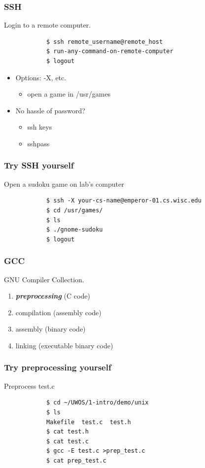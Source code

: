 \documentclass{beamer}
\begin{document}
	\begin{frame}[fragile]
		\frametitle{SSH}
		Login to a remote computer.
		\begin{center}
		\begin{verbatim}
			$ ssh remote_username@remote_host
			$ run-any-command-on-remote-computer
			$ logout
    \end{verbatim}
		\end{center}
		\begin{itemize}
      \item Options: -X, etc.
			\begin{itemize}
        \item open a game in /usr/games
      \end{itemize}
			\item No hassle of password? \\
			\begin{itemize}
				\item ssh keys
				\item sshpass
			\end{itemize}	
		\end{itemize}
	\end{frame}

	\begin{frame}[fragile]
		\frametitle{Try SSH yourself}
		Open a sudoku game on lab's computer
		\begin{center}
		\begin{verbatim}
			$ ssh -X your-cs-name@emperor-01.cs.wisc.edu
			$ cd /usr/games/
			$ ls
			$ ./gnome-sudoku
			$ logout
		\end{verbatim}
		\end{center}
	\end{frame}

  \begin{frame}
    \frametitle{GCC}
    GNU Compiler Collection.

		\begin{enumerate}
      \item \textbf{\textit{preprocessing}} (C code) 
      \item compilation (assembly code)
			\item assembly (binary code)
			\item linking (executable binary code)
    \end{enumerate}
	\end{frame}

	\begin{frame}[fragile]
		\frametitle{Try preprocessing yourself}
		Preprocess test.c
		\begin{center}
		\begin{verbatim}
			$ cd ~/UWOS/1-intro/demo/unix
			$ ls
			Makefile  test.c  test.h
			$ cat test.h
			$ cat test.c
			$ gcc -E test.c >prep_test.c
			$ cat prep_test.c
		\end{verbatim}
		\end{center}
	\end{frame}
\end{document}
